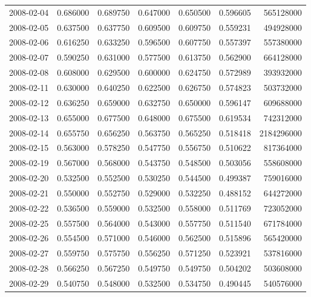 \begin{tabular}{lrrrrrr}
2008-02-04 &    0.686000 &    0.689750 &    0.647000 &    0.650500 &    0.596605 &   565128000 \\
2008-02-05 &    0.637500 &    0.637750 &    0.609500 &    0.609750 &    0.559231 &   494928000 \\
2008-02-06 &    0.616250 &    0.633250 &    0.596500 &    0.607750 &    0.557397 &   557380000 \\
2008-02-07 &    0.590250 &    0.631000 &    0.577500 &    0.613750 &    0.562900 &   664128000 \\
2008-02-08 &    0.608000 &    0.629500 &    0.600000 &    0.624750 &    0.572989 &   393932000 \\
2008-02-11 &    0.630000 &    0.640250 &    0.622500 &    0.626750 &    0.574823 &   503732000 \\
2008-02-12 &    0.636250 &    0.659000 &    0.632750 &    0.650000 &    0.596147 &   609688000 \\
2008-02-13 &    0.655000 &    0.677500 &    0.648000 &    0.675500 &    0.619534 &   742312000 \\
2008-02-14 &    0.655750 &    0.656250 &    0.563750 &    0.565250 &    0.518418 &  2184296000 \\
2008-02-15 &    0.563000 &    0.578250 &    0.547750 &    0.556750 &    0.510622 &   817364000 \\
2008-02-19 &    0.567000 &    0.568000 &    0.543750 &    0.548500 &    0.503056 &   558608000 \\
2008-02-20 &    0.532500 &    0.552500 &    0.530250 &    0.544500 &    0.499387 &   759016000 \\
2008-02-21 &    0.550000 &    0.552750 &    0.529000 &    0.532250 &    0.488152 &   644272000 \\
2008-02-22 &    0.536500 &    0.559000 &    0.532500 &    0.558000 &    0.511769 &   723052000 \\
2008-02-25 &    0.557500 &    0.564000 &    0.543000 &    0.557750 &    0.511540 &   671784000 \\
2008-02-26 &    0.554500 &    0.571000 &    0.546000 &    0.562500 &    0.515896 &   565420000 \\
2008-02-27 &    0.559750 &    0.575750 &    0.556250 &    0.571250 &    0.523921 &   537816000 \\
2008-02-28 &    0.566250 &    0.567250 &    0.549750 &    0.549750 &    0.504202 &   503608000 \\
2008-02-29 &    0.540750 &    0.548000 &    0.532500 &    0.534750 &    0.490445 &   540576000 \\

\end{tabular}
